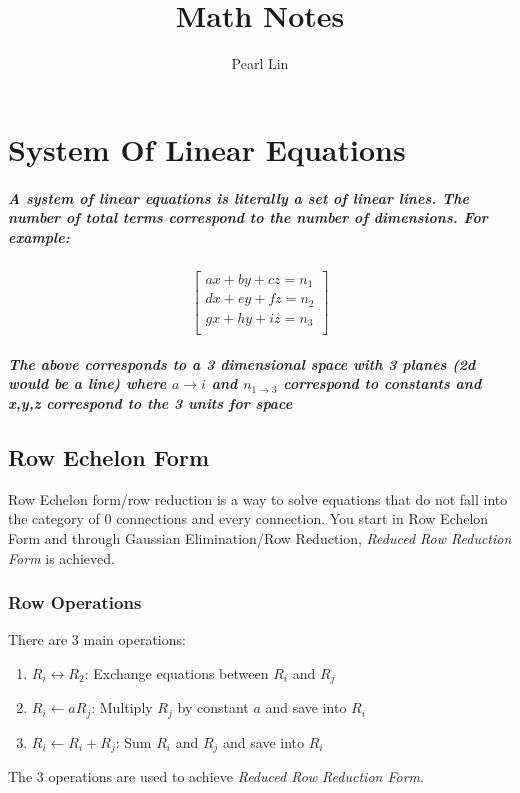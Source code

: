 \documentclass[11pt]{report}
\title{Math Notes}
\author{Pearl Lin}
\begin{document}
\maketitle
\tableofcontents

\chapter{System Of Linear Equations}
\paragraph{A system of linear equations is literally a set of linear lines. The number of total terms correspond to the number of dimensions. For example:}
$$
\begin{bmatrix}
	ax+by+cz=n_{1} \\
	dx+ey+fz=n_{2} \\
	gx+hy+iz=n_{3} \\
\end{bmatrix}
$$
\paragraph{The above corresponds to a 3 dimensional space with 3 planes (2d would be a line) where $a\to i$ and $n_{1\to3}$ correspond to constants and x,y,z correspond to the 3 units for space}

\section{Row Echelon Form}	
Row Echelon form/row reduction is a way to solve equations that do not fall into the category of 0 connections and every connection. You start in Row Echelon Form and through Gaussian Elimination/Row Reduction, \textit{Reduced Row Reduction Form} is achieved. 

\subsection{Row Operations}
There are 3 main operations:
\begin{enumerate}
	\item{$R_{i}\leftrightarrow R_{2}$: Exchange equations between $R_{i}$ and $R_{j}$}
	\item{$R_{i}\leftarrow aR_{j}$: Multiply $R_{j}$ by constant $a$ and save into $R_{i}$}
	\item{$R_{i}\leftarrow R_{i}+R_{j}$: Sum $R_{i}$ and $R_{j}$ and save into $R_{i}$}
\end{enumerate}
The 3 operations are used to achieve \textit{Reduced Row Reduction Form}.
\end{document}
